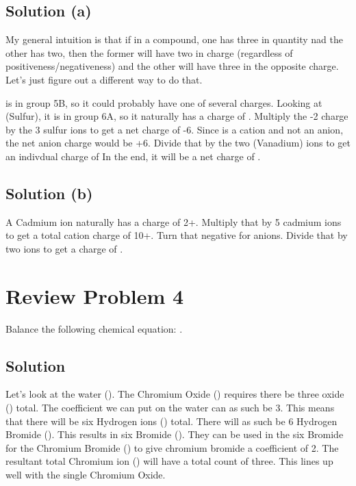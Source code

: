 \documentclass[10pt]{article}
\begin{document}
        \subsection{Solution (a)}
            My general intuition is that if in a compound, one has three in quantity nad the other has two, then the former will have two in charge (regardless of positiveness/negativeness) and the other will have three in the opposite charge.
            Let's just figure out a different way to do that.

             is in group 5B, so it could probably have one of several charges. 
            Looking at  (Sulfur), it is in group 6A, so it naturally has a charge of .
            Multiply the -2 charge by the 3 sulfur ions to get a net charge of -6.
            Since  is a cation and not an anion, the net anion charge would be +6.
            Divide that by the two  (Vanadium) ions to get an indivdual charge of 
            In the end, it will be a net charge of .

        \subsection{Solution (b)}
            A Cadmium ion naturally has a charge of 2+.
            Multiply that by 5 cadmium ions to get a total cation charge of 10+.
            Turn that negative for anions.
            Divide that by two  ions to get a charge of .

    \pagebreak
    \section{Review Problem 4}
        Balance the following chemical equation: .

        \subsection{Solution}
            Let's look at the water ().
            The Chromium Oxide () requires there be three oxide () total.
            The coefficient we can put on the water can as such be 3.
            This means that there will be six Hydrogen ions () total.
            There will as such be 6 Hydrogen Bromide ().
            This results in six Bromide ().
            They can be used in the six Bromide for the Chromium Bromide () to give chromium bromide a coefficient of 2.
            The resultant total Chromium ion () will have a total count of three.
            This lines up well with the single Chromium Oxide.
            \begin{center}
            \end{center}
\end{document}
